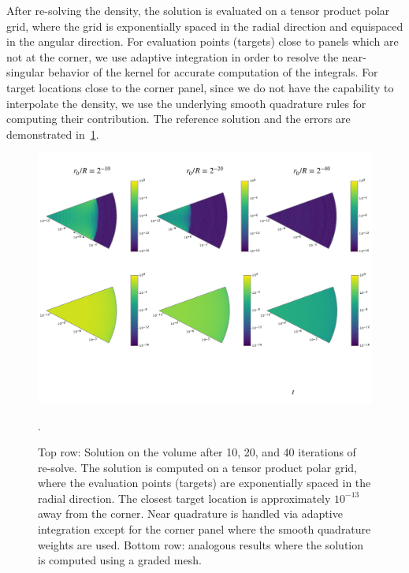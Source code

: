 After re-solving the density, the solution is evaluated on a tensor product polar grid, where the grid
is exponentially spaced in the radial direction and equispaced in the angular direction. For evaluation points (targets)
close to panels which are not at the corner, we use adaptive integration in order to resolve the near-singular behavior of
the kernel for accurate computation of the integrals. For target locations close to the corner panel, since we do not have
the capability to interpolate the density, we use the underlying smooth quadrature rules for computing their contribution. 
The reference solution and the errors are demonstrated in~\cref{fig:vol-plot}.
\begin{figure}
\begin{center}
\includegraphics[width=\linewidth]{media/volume}
\caption{Top row: Solution on the volume after 10, 20, and 40 iterations of re-solve. The solution is computed on a tensor product polar grid, where the evaluation points (targets) are exponentially spaced in the radial direction. The closest target location is approximately $10^{-13}$ away from the corner. Near quadrature is handled via adaptive integration except for the corner panel where the smooth quadrature weights are used. Bottom row: analogous results where the solution is computed using a graded mesh.   }.
\label{fig:vol-plot}
\end{center}
\end{figure}


